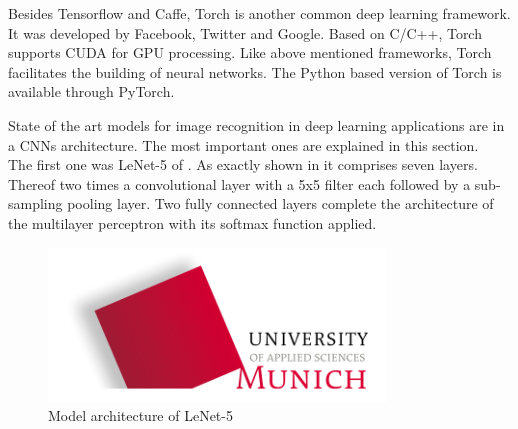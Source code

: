 Besides Tensorflow and Caffe, Torch is another common deep learning framework. It was developed by Facebook, Twitter and Google. Based on C/C++, Torch supports CUDA for GPU processing. Like above mentioned frameworks, Torch facilitates the building of neural networks. The Python based version of Torch is available through PyTorch.
		
	State of the art models for image recognition in deep learning applications are in a CNNs architecture. The most important ones are explained in this section. \\
	The first one was LeNet-5 of \citet{LeCun1998}. As exactly shown in  it comprises seven layers. Thereof two times a convolutional layer with a 5x5 filter each followed by a sub-sampling pooling layer. Two fully connected layers complete the architecture of the multilayer perceptron with its softmax function applied.
	
\begin{figure}[htbp]
\includegraphics[width=0.8\textwidth]{includes/MUASlogo}
\caption[Model architecture of LeNet-5]{Model architecture of LeNet-5 \citep{LeCun1998}}
\label{fig:FH-Logo0}
\end{figure} 

